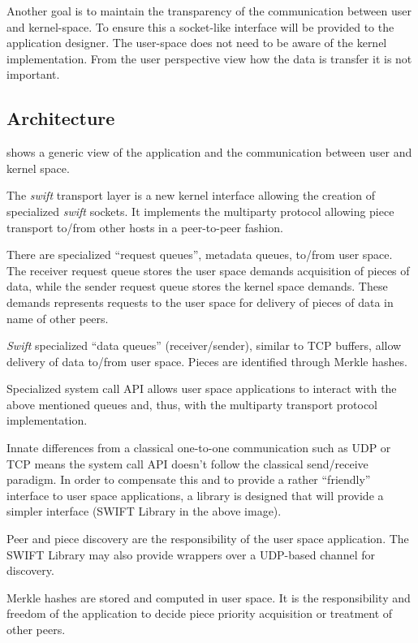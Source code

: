 Another goal is to maintain the transparency of the communication between user and kernel-space. To ensure this a 
socket-like interface will be provided to the application designer. The user-space does not need to be aware of the
kernel implementation. From the user perspective view how the data is transfer it is not important.

\subsection{Architecture}

 shows a generic view of the application and the communication between user and kernel 
space.


The \emph{swift} transport layer is a new kernel interface allowing the creation of specialized \emph{swift} sockets.
It implements the multiparty protocol allowing piece transport to/from other hosts in a peer-to-peer fashion.

There are specialized “request queues”, metadata queues, to/from user space. The receiver request queue stores the user 
space demands acquisition of pieces of data, while the sender request queue stores the kernel space demands. These
demands represents requests to the user space for delivery of pieces of data in name of other peers. 

\emph{Swift} specialized “data queues” (receiver/sender), similar to TCP buffers, allow delivery of data to/from user 
space. Pieces are identified through Merkle hashes.

Specialized system call API allows user space applications to interact with the above mentioned queues and, thus, with 
the multiparty transport protocol implementation.

Innate differences from a classical one-to-one communication such as UDP or TCP means the system call API doesn't
follow the classical send/receive paradigm. In order to compensate this and to provide a rather “friendly” interface to
user space applications, a library is designed that will provide a simpler interface (SWIFT Library in the above image).

Peer and piece discovery are the responsibility of the user space application. The SWIFT Library may also provide 
wrappers over a UDP-based channel for discovery.

Merkle hashes are stored and computed in user space. It is the responsibility and freedom of the application to decide 
piece priority acquisition or treatment of other peers. 

